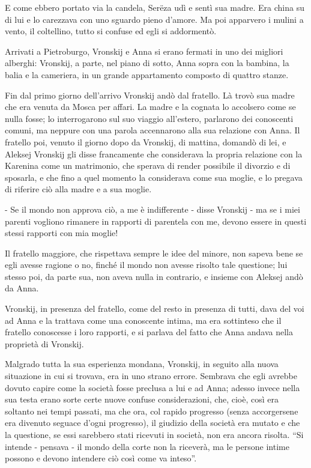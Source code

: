 E come ebbero portato via la candela, Serëza udì e sentì sua madre. Era china su di lui e lo carezzava con uno sguardo pieno d'amore. Ma poi apparvero i mulini a vento, il coltellino, tutto si confuse ed egli si addormentò. 

\label{xxviii-3} 

Arrivati a Pietroburgo, Vronskij e Anna si erano fermati in uno dei migliori alberghi: Vronskij, a parte, nel piano di sotto, Anna sopra con la bambina, la balia e la cameriera, in un grande appartamento composto di quattro stanze. 

Fin dal primo giorno dell'arrivo Vronskij andò dal fratello. Là trovò sua madre che era venuta da Mosca per affari. La madre e la cognata lo accolsero come se nulla fosse; lo interrogarono sul suo viaggio all'estero, parlarono dei conoscenti comuni, ma neppure con una parola accennarono alla sua relazione con Anna. Il fratello poi, venuto il giorno dopo da Vronskij, di mattina, domandò di lei, e Aleksej Vronskij gli disse francamente che considerava la propria relazione con la Karenina come un matrimonio, che sperava di render possibile il divorzio e di sposarla, e che fino a quel momento la considerava come sua moglie, e lo pregava di riferire ciò alla madre e a sua moglie. 

- Se il mondo non approva ciò, a me è indifferente - disse Vronskij - ma se i miei parenti vogliono rimanere in rapporti di parentela con me, devono essere in questi stessi rapporti con mia moglie! 

Il fratello maggiore, che rispettava sempre le idee del minore, non sapeva bene se egli avesse ragione o no, finché il mondo non avesse risolto tale questione; lui stesso poi, da parte sua, non aveva nulla in contrario, e insieme con Aleksej andò da Anna. 

Vronskij, in presenza del fratello, come del resto in presenza di tutti, dava del voi ad Anna e la trattava come una conoscente intima, ma era sottinteso che il fratello conoscesse i loro rapporti, e si parlava del fatto che Anna andava nella proprietà di Vronskij. 

Malgrado tutta la sua esperienza mondana, Vronskij, in seguito alla nuova situazione in cui si trovava, era in uno strano errore. Sembrava che egli avrebbe dovuto capire come la società fosse preclusa a lui e ad Anna; adesso invece nella sua testa erano sorte certe nuove confuse considerazioni, che, cioè, così era soltanto nei tempi passati, ma che ora, col rapido progresso (senza accorgersene era divenuto seguace d'ogni progresso), il giudizio della società era mutato e che la questione, se essi sarebbero stati ricevuti in società, non era ancora risolta. ``Si intende - pensava - il mondo della corte non la riceverà, ma le persone intime possono e devono intendere ciò così come va inteso''. 

